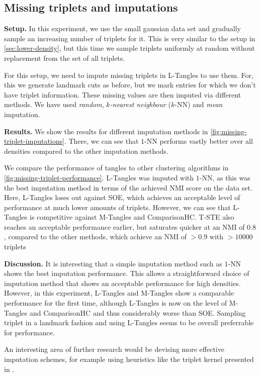 \subsection{Missing triplets and imputations}\label{sec:imputation}
\textbf{Setup.}
In this experiment, we use the small gaussian data set and gradually sample an increasing number of triplets for it. 
This is very similar to the setup in \autoref{sec:lower-density}, but this time we sample triplets uniformly at random without replacement
from the set of all triplets. 

For this setup, we need to impute missing triplets in L-Tangles to use them. For, this we generate landmark cuts as before,
but we mark entries for which we don't have triplet information. These missing values are then imputed via different methods.
We have used \textit{random}, \textit{$k$-nearest neighbour }($k$-NN) and \textit{mean} imputation. 

\textbf{Results.}
We show the results for different imputation methods in \autoref{fig:missing-triplet-imputations}. 
There, we can see that $1$-NN performs vastly better over all densities compared to the other imputation methods.

We compare the performance of tangles to other clustering algorithms in \autoref{fig:missing-triplet-performance}. L-Tangles was imputed with $1$-NN, as this
was the best imputation method in terms of the achieved NMI score on the data set. 
Here, L-Tangles loses out against SOE, which achieves an acceptable level of performance at much lower amounts of triplets. 
However, we can see that L-Tangles is competitive against M-Tangles and ComparisonHC. T-STE also reaches an acceptable performance earlier, but saturates quicker at an NMI of $0.8$, compared to the other methods, which achieve an NMI of $>0.9$ with $>10000$ triplets

\textbf{Discussion.}
It is interesting that a simple imputation method such as $1$-NN shows the best imputation performance. This allows a straightforward choice of imputation method that shows an acceptable
performance for high densities. However, in this experiment, L-Tangles and M-Tangles show a comparable performance for the first time, although L-Tangles is now on the level of M-Tangles 
and ComparisonHC and thus considerably worse than SOE. Sampling triplet in a landmark fashion and using L-Tangles seems to be overall preferrable for performance.

An interesting area of further research would be devising more effective imputation schemes, for example using heuristics like the
triplet kernel presented in \cite{kleindessnerKernelFunctionsBased2017}.

